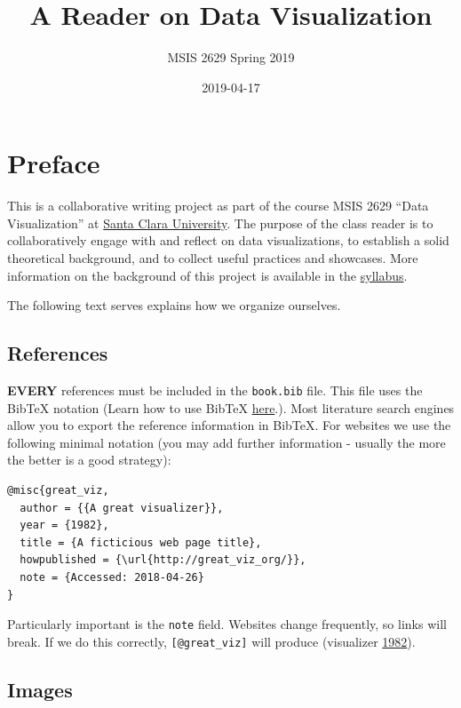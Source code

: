 \documentclass[]{book}
\title{A Reader on Data Visualization}
\author{MSIS 2629 Spring 2019}
\date{2019-04-17}
\begin{document}
\maketitle

{
\setcounter{tocdepth}{1}
\tableofcontents
}
\chapter{Preface}\label{preface}

This is a collaborative writing project as part of the course MSIS 2629
``Data Visualization'' at \href{http://www.scu.edu}{Santa Clara
University}. The purpose of the class reader is to collaboratively
engage with and reflect on data visualizations, to establish a solid
theoretical background, and to collect useful practices and showcases.
More information on the background of this project is available in the
\href{https://mschermann.github.io/msis2629spring2019}{syllabus}.

The following text serves explains how we organize ourselves.

\section{References}\label{references}

\textbf{EVERY} references must be included in the \texttt{book.bib}
file. This file uses the BibTeX notation (Learn how to use BibTeX
\href{http://www.bibtex.org/Using/}{here}.). Most literature search
engines allow you to export the reference information in BibTeX. For
websites we use the following minimal notation (you may add further
information - usually the more the better is a good strategy):

\begin{verbatim}
@misc{great_viz,
  author = {{A great visualizer}},
  year = {1982},
  title = {A ficticious web page title},
  howpublished = {\url{http://great_viz_org/}},
  note = {Accessed: 2018-04-26}
}
\end{verbatim}

Particularly important is the \texttt{note} field. Websites change
frequently, so links will break. If we do this correctly,
\texttt{{[}@great\_viz{]}} will produce (visualizer
\protect\hyperlink{ref-great_viz}{1982}).

\section{Images}\label{images}
\end{document}
